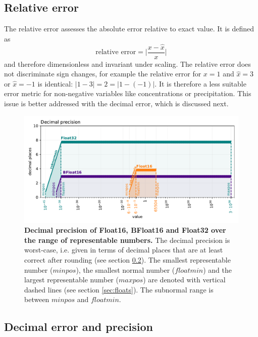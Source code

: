 \subsection{Relative error}
\label{sec:relative_error}

The relative error assesses the absolute error relative to exact value. It is defined as
\begin{equation}
	\text{relative error} = \vert \frac{x - \hat{x}}{x} \vert
	\label{eq:relerror}
\end{equation}
and therefore dimensionless and invariant under scaling. The relative error does not discriminate sign changes, for example
the relative error for $x=1$ and $\hat{x} = 3$ or $\hat{x} = -1$ is identical: $\vert 1- 3 \vert = 2 = \vert 1 - (-1) \vert$. It is therefore
a less suitable error metric for non-negative variables like concentrations or precipitation. This issue is better addressed with
the decimal error, which is discussed next.

\begin{figure}[tbhp]
	\includegraphics[width=1\textwidth]{Figures/methods/float32_16_bfloat_decprec.pdf}
	\caption{\textbf{Decimal precision of Float16, BFloat16 and Float32 over the range of representable numbers.}
	The decimal precision is worst-case, i.e. given in terms of decimal places that are at least correct after rounding
	(see section \ref{sec:decimal_precision}). The smallest representable number ($minpos$), the smallest normal number
	($floatmin$) and the largest representable number ($maxpos$) are denoted with vertical dashed lines (see section \ref{sec:floats}).
	The subnormal range is between $minpos$ and $floatmin$.}
	\label{fig:methods_decprec_floats}
\end{figure}

\subsection{Decimal error and precision}
\label{sec:decimal_precision}


